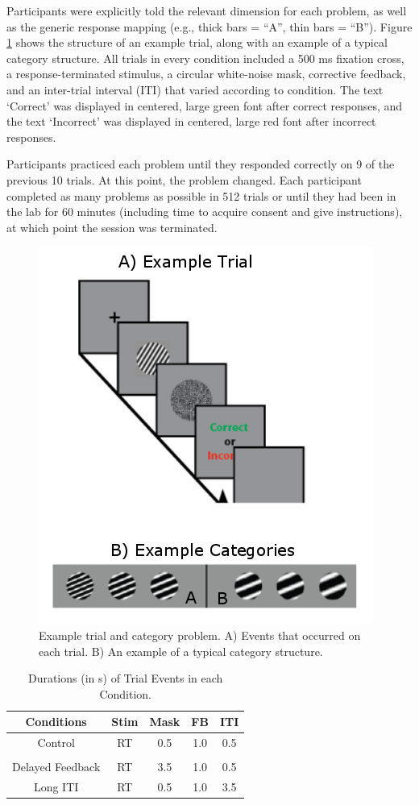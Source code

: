 \documentclass[doc, floatsintext]{apa7}
\begin{document}
Participants were explicitly told the relevant dimension for
each problem, as well as the generic response mapping (e.g.,
thick bars = ``A'', thin bars = ``B''). Figure
\ref{fig:trial} shows the structure of an example trial,
along with an example of a typical category structure. All
trials in every condition included a 500 ms fixation cross,
a response-terminated stimulus, a circular white-noise mask,
corrective feedback, and an inter-trial interval (ITI) that
varied according to condition. The text `Correct' was
displayed in centered, large green font after correct
responses, and the text `Incorrect' was displayed in
centered, large red font after incorrect responses.

Participants practiced each problem until they responded
correctly on 9 of the previous 10 trials. At this point, the
problem changed. Each participant completed as many problems
as possible in 512 trials or until they had been in the lab
for 60 minutes (including time to acquire consent and give
instructions), at which point the session was terminated.

\begin{figure}
  \centering
  \includegraphics[width=.5\textwidth]{../figures/fig_design_exp_1.png}
  \caption{
      Example trial and category problem. A) Events that
      occurred on each trial. B) An example of a typical
      category structure.
}
  \label{fig:trial}
\end{figure}

\begin{table}
    \caption{
        Durations (in s) of Trial Events in each Condition.
    }
    \label{conditions_exp_1}
    \begin{tabular}{c|cccc}
        Conditions & Stim & Mask & FB & ITI \\[0.5ex] \hline Control & RT & 0.5 &
        1.0 & 0.5 \\[0.5ex]
        \\[-1.5ex] Delayed Feedback &
        RT & 3.5 & 1.0 & 0.5 \\[0.5ex]   Long ITI & RT & 0.5 & 1.0 & 3.5
        \\[0.5ex]
    \end{tabular}
\end{table}
\end{document}
